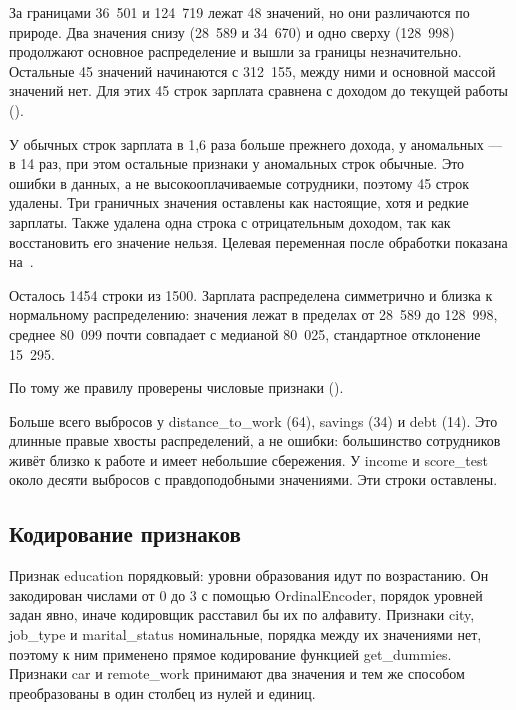 \documentclass[a4paper,14pt]{extarticle}
\begin{document}
За границами 36~501 и 124~719 лежат 48 значений, но они различаются по природе. Два значения снизу (28~589 и 34~670) и одно сверху (128~998) продолжают основное распределение и вышли за границы незначительно. Остальные 45 значений начинаются с 312~155, между ними и основной массой значений нет. Для этих 45 строк зарплата сравнена с доходом до текущей работы ().


У обычных строк зарплата в 1,6 раза больше прежнего дохода, у аномальных — в 14 раз, при этом остальные признаки у аномальных строк обычные. Это ошибки в данных, а не высокооплачиваемые сотрудники, поэтому 45 строк удалены. Три граничных значения оставлены как настоящие, хотя и редкие зарплаты. Также удалена одна строка с отрицательным доходом, так как восстановить его значение нельзя. Целевая переменная после обработки показана на~.


Осталось 1454 строки из 1500. Зарплата распределена симметрично и близка к нормальному распределению: значения лежат в пределах от 28~589 до 128~998, среднее 80~099 почти совпадает с медианой 80~025, стандартное отклонение 15~295.

По тому же правилу проверены числовые признаки ().


Больше всего выбросов у distance\_to\_work (64), savings (34) и debt (14). Это длинные правые хвосты распределений, а не ошибки: большинство сотрудников живёт близко к работе и имеет небольшие сбережения. У income и score\_test около десяти выбросов с правдоподобными значениями. Эти строки оставлены.

\subsection{Кодирование признаков}

Признак education порядковый: уровни образования идут по возрастанию. Он закодирован числами от 0 до 3 с помощью OrdinalEncoder, порядок уровней задан явно, иначе кодировщик расставил бы их по алфавиту. Признаки city, job\_type и marital\_status номинальные, порядка между их значениями нет, поэтому к ним применено прямое кодирование функцией get\_dummies. Признаки car и remote\_work принимают два значения и тем же способом преобразованы в один столбец из нулей и единиц.
\end{document}
